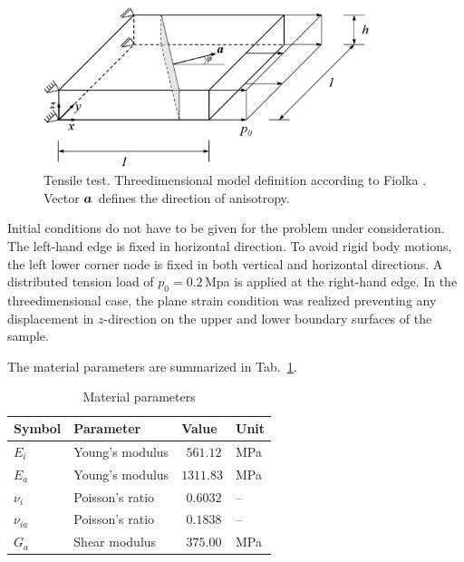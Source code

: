 \begin{figure}[!htb]
\begin{center}
\includegraphics[width=0.85\textwidth]{PART_II/M/tenstest_model_3D.eps}
\end{center}
\caption{Tensile test. Threedimensional model definition according to Fiolka \cite{Fiolka:2007}. Vector $\mbox{${\mbox{\boldmath${a}$\unboldmath}}_{\:\!}$}$ defines the direction of anisotropy.} 
\label{Me_tens_transiso_model_3d}
\end{figure}

Initial conditions do not have to be given for the problem under consideration. The left-hand edge is fixed in horizontal direction. To avoid rigid body motions, the left lower corner node is fixed in both vertical and horizontal directions. A distributed tension load of $p_0=0.2\,$Mpa is applied at the right-hand edge. In the threedimensional case, the plane strain condition was realized preventing any displacement in $z$-direction on the upper and lower boundary surfaces of the sample.

The material parameters are summarized in Tab.~\ref{Me_matpar_transiso_tens}.

\begin{table}[!htb]
\centering
\caption{Material parameters}
\label{Me_matpar_transiso_tens}
\begin{tabular}{llll}
\toprule
Symbol & Parameter & Value & Unit \\
\midrule
$E_i$      & Young's modulus & $\ \,561.12$ & MPa \\
$E_a$      & Young's modulus & $1311.83$    & MPa \\
$\nu_i$    & Poisson's ratio & $\ \,0.6032$ & --  \\
$\nu_{ia}$ & Poisson's ratio & $\ \,0.1838$ & --  \\
$G_a$      & Shear modulus   & $\ \,375.00$ & MPa \\
\bottomrule
\end{tabular}
\end{table}

